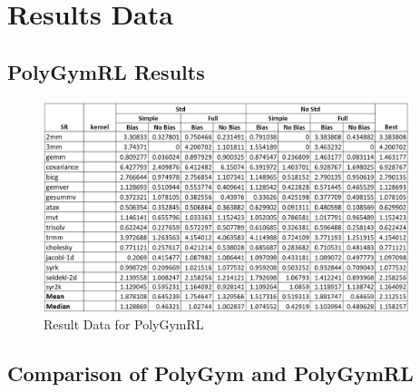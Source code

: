 \documentclass[logo,msc]{infthesis}           %
\begin{document}
\appendix

\chapter{Results Data}

\section{PolyGymRL Results}

\begin{figure}[htbp]
  \centering
  \includegraphics[width=0.95\textwidth]{Images/BenchMarking.png}    
  \caption{Result Data for PolyGymRL}
  \label{fig:BenchMarking}
\end{figure}

\section{Comparison of PolyGym and PolyGymRL}
\end{document}
